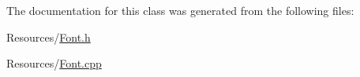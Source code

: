 The documentation for this class was generated from the following files\-:\begin{DoxyCompactItemize}
\item 
Resources/\hyperlink{_font_8h}{Font.\-h}\item 
Resources/\hyperlink{_font_8cpp}{Font.\-cpp}\end{DoxyCompactItemize}
